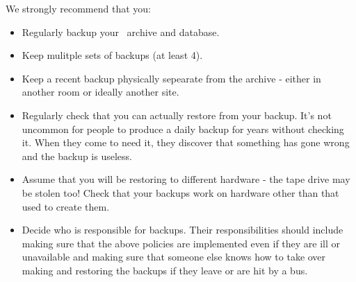 \par We strongly recommend that you:
\begin{itemize}
\item Regularly backup your \eprints\ archive and database.
\item Keep mulitple sets of backups (at least 4). 
\item Keep a recent backup physically sepearate from the archive - either in another room or ideally another site. 
\item Regularly check that you can actually restore from your backup. It's not uncommon for people to produce a daily backup for years without checking it. When they come to need it, they discover that something has gone wrong and the backup is useless. 
\item Assume that you will be restoring to different hardware - the tape drive may be stolen too! Check that your backups work on hardware other than that used to create them.
\item Decide who is responsible for backups. Their responsibilities should include making sure that the above policies are implemented even if they are ill or unavailable and making sure that someone else knows how to take over making and restoring the backups if they leave or are hit by a bus.
\end{itemize}

